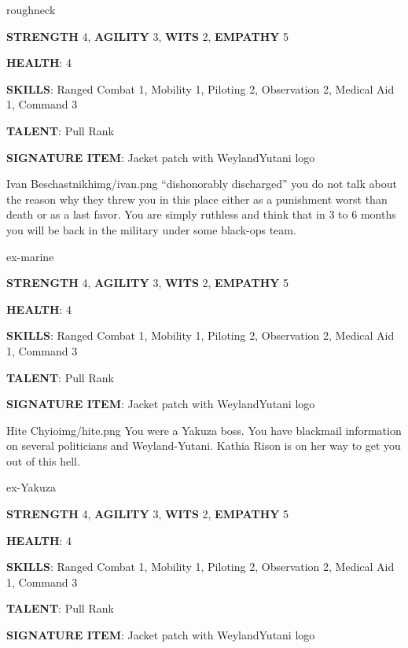 \begin{rpg-commentbox}{}
    roughneck

    \textbf{STRENGTH} 4, \textbf{AGILITY} 3, \textbf{WITS} 2, \textbf{EMPATHY} 5

    \textbf{HEALTH}: 4

    \textbf{SKILLS}: Ranged Combat 1, Mobility 1, Piloting 2, Observation 2, Medical Aid 1, Command 3
    
    \textbf{TALENT}: Pull Rank
    
    \textbf{SIGNATURE ITEM}: Jacket patch with WeylandYutani logo    
\end{rpg-commentbox}

\newsect


\begin{rpg-pcbox}{Ivan Beschastnikh}{img/ivan.png}
    ``dishonorably discharged'' you do not talk about the reason why they threw you in this place either as a punishment worst than death or as a last favor. You are simply ruthless and think that in 3 to 6 months you will be back in the military under some black-ops team.
\end{rpg-pcbox}

\begin{rpg-commentbox}{}
    ex-marine

    \textbf{STRENGTH} 4, \textbf{AGILITY} 3, \textbf{WITS} 2, \textbf{EMPATHY} 5

    \textbf{HEALTH}: 4

    \textbf{SKILLS}: Ranged Combat 1, Mobility 1, Piloting 2, Observation 2, Medical Aid 1, Command 3
    
    \textbf{TALENT}: Pull Rank
    
    \textbf{SIGNATURE ITEM}: Jacket patch with WeylandYutani logo    
\end{rpg-commentbox}

\newsect

\begin{rpg-pcbox}{Hite Chyio}{img/hite.png}
    You were a Yakuza boss. You have blackmail information on several politicians and Weyland-Yutani. Kathia Rison is on her way to get you out of this hell. 
\end{rpg-pcbox}

\begin{rpg-commentbox}{}
    ex-Yakuza

    \textbf{STRENGTH} 4, \textbf{AGILITY} 3, \textbf{WITS} 2, \textbf{EMPATHY} 5

    \textbf{HEALTH}: 4

    \textbf{SKILLS}: Ranged Combat 1, Mobility 1, Piloting 2, Observation 2, Medical Aid 1, Command 3
    
    \textbf{TALENT}: Pull Rank
    
    \textbf{SIGNATURE ITEM}: Jacket patch with WeylandYutani logo    
\end{rpg-commentbox}



